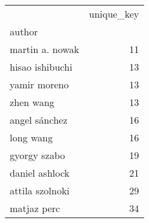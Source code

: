 \begin{tabular}{lr}
\toprule
{} &  unique\_key \\
author          &             \\
\midrule
martin a. nowak &          11 \\
hisao ishibuchi &          13 \\
yamir moreno    &          13 \\
zhen wang       &          13 \\
angel sánchez   &          16 \\
long wang       &          16 \\
gyorgy szabo    &          19 \\
daniel ashlock  &          21 \\
attila szolnoki &          29 \\
matjaz perc     &          34 \\
\bottomrule
\end{tabular}
